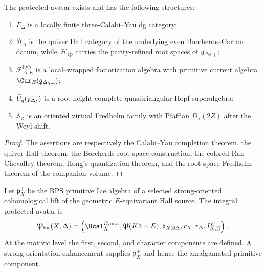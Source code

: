\begin{theorem}
The protected avatar exists and has the following structures:
\begin{enumerate}
\item $\Gamma_\Delta$ is a locally finite three-Calabi--Yau dg category;
\item $\mathcal B_\Delta$ is the quiver Hall category of the underlying even Borcherds--Cartan datum, while $\mathcal H_{\mathrm{1p}}$ carries the parity-refined root spaces of ${\mathfrak g_{\Delta_5}}_+$;
\item $\mathcal F^{\mathrm{hyb}}_{\Delta,E}$ is a local--wrapped factorization algebra with primitive current algebra $\Cur_E(\gDelta_+)$;
\item $\widehat U_q({\mathfrak g_{\Delta_5}})$ is a root-height-complete quasitriangular Hopf superalgebra;
\item $\mathbb A_Z$ is an oriented virtual Fredholm family with Pfaffian $D_5(2Z)$ after the Weyl shift.
\end{enumerate}
\end{theorem}
\begin{proof}
The assertions are respectively the Calabi--Yau completion theorem, the quiver Hall theorem, the Borcherds root-space construction, the colored-Ran Chevalley theorem, Hong's quantization theorem, and the root-space Fredholm theorem of the companion volume.
\end{proof}

\begin{definition}
Let $\mathfrak p_X^+$ be the BPS primitive Lie algebra of a selected strong-oriented cohomological lift of the geometric $E$-equivariant Hall source.  The integral protected avatar is
\[
 \mathfrak P_{\mathrm{int}}(X,\Delta)
 =\left(
   \Hcal_X^{E,\mathrm{mot}},
   \mathfrak P(K3\times E),
   \mathfrak b_{X\boxtimes\Delta},
   r_X,r_\Delta,
   I_{X,\Pi}^E
 \right).
\]
At the motivic level the first, second, and character components are defined.  A strong orientation enhancement supplies $\mathfrak p_X^+$ and hence the amalgamated primitive component.
\end{definition}

